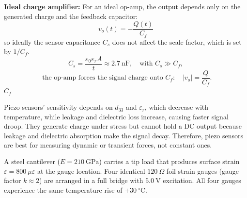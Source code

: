 \begin{solutionblock}
\textbf{Ideal charge amplifier:} For an ideal op-amp, the output depends only on the generated charge and the feedback capacitor:
\[
v_o(t) = -\frac{Q(t)}{C_f}
\]
so ideally the sensor capacitance \(C_s\) does not affect the scale factor, which is set by \(1/C_f\).
\[
C_s = \frac{\varepsilon_0 \varepsilon_r A}{t} \approx 2.7~\mathrm{nF}, \quad
\text{with } C_s \gg C_f, \]
\[\text{ the op-amp forces the signal charge onto } C_f:
\quad |v_o| = \frac{Q}{C_f}.\]
 $C_f$ 

\end{solutionblock}





\begin{solutionblock}
Piezo sensors’ sensitivity depends on $d_{33}$ and $\varepsilon_r$, which decrease with temperature, 
while leakage and dielectric loss increase, causing faster signal droop. 
They generate charge under stress but cannot hold a DC output because leakage and dielectric 
absorption make the signal decay. 
Therefore, piezo sensors are best for measuring dynamic or transient forces, not constant ones.
\end{solutionblock}



A steel cantilever ($E = 210~\text{GPa}$) carries a tip load that produces surface strain $\varepsilon = 800~\mu\varepsilon$ at the gauge location.
Four identical $120~\Omega$ foil strain gauges (gauge factor $k \approx 2$) are arranged in a full bridge with $5.0~\text{V}$ excitation.
All four gauges experience the same temperature rise of $+30~^\circ\text{C}$.



